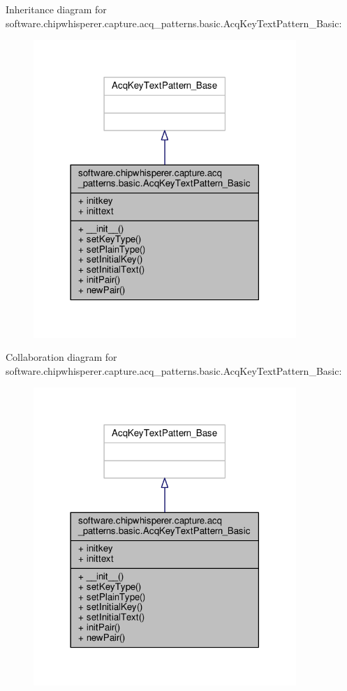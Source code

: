 Inheritance diagram for software.\+chipwhisperer.\+capture.\+acq\+\_\+patterns.\+basic.\+Acq\+Key\+Text\+Pattern\+\_\+\+Basic\+:\nopagebreak
\begin{figure}[H]
\begin{center}
\leavevmode
\includegraphics[width=282pt]{d1/d53/classsoftware_1_1chipwhisperer_1_1capture_1_1acq__patterns_1_1basic_1_1AcqKeyTextPattern__Basic__inherit__graph}
\end{center}
\end{figure}


Collaboration diagram for software.\+chipwhisperer.\+capture.\+acq\+\_\+patterns.\+basic.\+Acq\+Key\+Text\+Pattern\+\_\+\+Basic\+:\nopagebreak
\begin{figure}[H]
\begin{center}
\leavevmode
\includegraphics[width=282pt]{d8/df7/classsoftware_1_1chipwhisperer_1_1capture_1_1acq__patterns_1_1basic_1_1AcqKeyTextPattern__Basic__coll__graph}
\end{center}
\end{figure}


